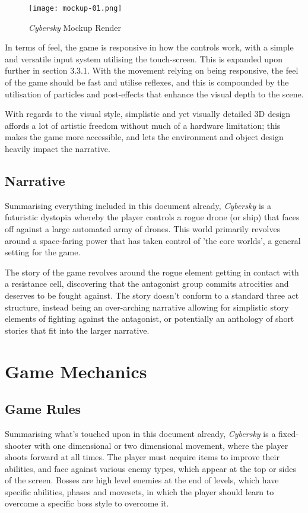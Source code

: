 \documentclass{scrartcl}
\begin{document}
\begin{figure}[!h]
  \centering
  \texttt{[image: mockup-01.png]}
  \caption[\textit{Cybersky}]{\textit{Cybersky} Mockup Render}
\end{figure}

In terms of feel, the game is responsive in how the controls work, with a simple and versatile input system utilising the touch-screen. This is expanded upon further in section 3.3.1. With the movement relying on being responsive, the feel of the game should be fast and utilise reflexes, and this is compounded by the utilisation of particles and post-effects that enhance the visual depth to the scene.

With regards to the visual style, simplistic and yet visually detailed 3D design affords a lot of artistic freedom without much of a hardware limitation; this makes the game more accessible, and lets the environment and object design heavily impact the narrative.

\subsection{Narrative}

Summarising everything included in this document already, \emph{Cybersky} is a futuristic dystopia whereby the player controls a rogue drone (or ship) that faces off against a large automated army of drones. This world primarily revolves around a space-faring power that has taken control of 'the core worlds', a general setting for the game.

The story of the game revolves around the rogue element getting in contact with a resistance cell, discovering that the antagonist group commits atrocities and deserves to be fought against. The story doesn't conform to a standard three act structure, instead being an over-arching narrative allowing for simplistic story elements of fighting against the antagonist, or potentially an anthology of short stories that fit into the larger narrative.

\section{
  Game Mechanics
 }

\subsection{Game Rules}

Summarising what's touched upon in this document already, \emph{Cybersky} is a fixed-shooter with one dimensional or two dimensional movement, where the player shoots forward at all times. The player must acquire items to improve their abilities, and face against various enemy types, which appear at the top or sides of the screen. Bosses are high level enemies at the end of levels, which have specific abilities, phases and movesets, in which the player should learn to overcome a specific boss style to overcome it.
\end{document}

